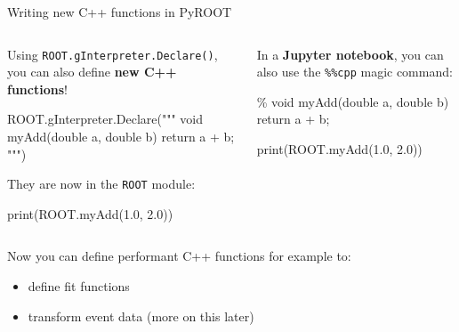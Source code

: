 \documentclass[aspectratio=169]{beamer}
\begin{document}
\begin{frame}[fragile]{Writing new C++ functions in PyROOT}
\begin{columns}
    \begin{column}{0.5\textwidth}
        Using \texttt{ROOT.gInterpreter.Declare()}, you can also define \textbf{new C++ functions}!
        \begin{pycell}
ROOT.gInterpreter.Declare("""
void myAdd(double a, double b) {
    return a + b;
}
""")
        \end{pycell}
        They are now in the \texttt{ROOT} module:
        \begin{pycell}
print(ROOT.myAdd(1.0, 2.0))
        \end{pycell}
    \end{column}
    \begin{column}{0.5\textwidth}
        In a \textbf{Jupyter notebook}, you can also use the \texttt{\%\%cpp} magic command:
        \begin{cppcell}
\%%
void myAdd(double a, double b) {
    return a + b;
}
        \end{cppcell}
        \begin{pycell}
print(ROOT.myAdd(1.0, 2.0))
        \end{pycell}
    \end{column}
\end{columns}

    \vspace{4mm}
Now you can define performant C++ functions for example to:

\begin{itemize}
    \item define fit functions
    \item transform event data (more on this later)
\end{itemize}

\end{frame}
\end{document}
